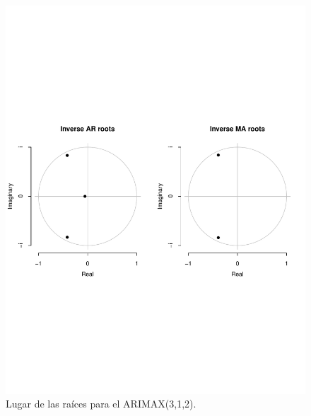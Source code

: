 \documentclass[conference]{IEEEtran}
\begin{document}
\begin{figure}
    \centering
    \includegraphics[width=\columnwidth]{figs/Arimaxstationary.pdf}
    \caption{Lugar de las raíces para el ARIMAX(3,1,2).}
    \label{fig:Inverti2}
\end{figure}
\end{document}
